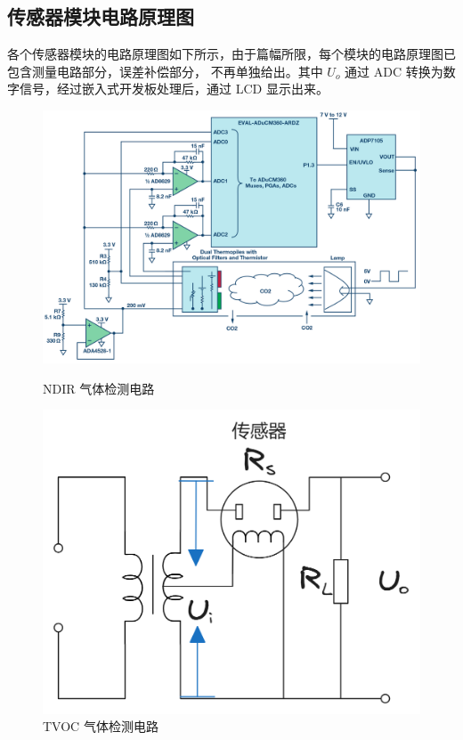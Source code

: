 \documentclass[12pt,hyperref,a4paper,UTF8]{ctexart}
\begin{document}
\subsection{传感器模块电路原理图}
各个传感器模块的电路原理图如下所示，由于篇幅所限，每个模块的电路原理图已包含测量电路部分，误差补偿部分，
不再单独给出。其中 $U_o$ 通过 ADC 转换为数字信号，经过嵌入式开发板处理后，通过 LCD 显示出来。
\begin{figure}[htbp]
    \centering
    \begin{minipage}{0.6\textwidth}
        \centering
        \includegraphics[width =1\textwidth]{figures/CO2_sensor.png}
        \caption{NDIR 气体检测电路}
        \label{CO2_sensor}
    \end{minipage}
    \begin{minipage}{0.35\textwidth}
        \centering
        \includegraphics[width =.7\textwidth]{figures/TVOC_sensor.png}
        \caption{TVOC 气体检测电路}
        \label{TVOC_sensor}
    \end{minipage}
\end{figure}
\end{document}
